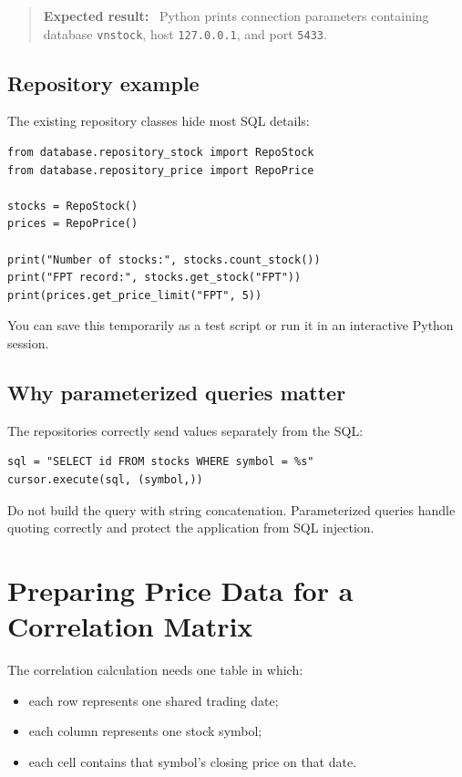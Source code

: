 \documentclass[11pt,a4paper]{article}
\newenvironment{result}
  {\begin{quote}\color{codegreen}\textbf{Expected result:}\ }
  {\end{quote}}
\begin{document}
\begin{result}
Python prints connection parameters containing database
\texttt{vnstock}, host \texttt{127.0.0.1}, and port \texttt{5433}.
\end{result}

\subsection{Repository example}

The existing repository classes hide most SQL details:

\begin{lstlisting}[style=python]
from database.repository_stock import RepoStock
from database.repository_price import RepoPrice

stocks = RepoStock()
prices = RepoPrice()

print("Number of stocks:", stocks.count_stock())
print("FPT record:", stocks.get_stock("FPT"))
print(prices.get_price_limit("FPT", 5))
\end{lstlisting}

You can save this temporarily as a test script or run it in an interactive
Python session.

\subsection{Why parameterized queries matter}

The repositories correctly send values separately from the SQL:

\begin{lstlisting}[style=python]
sql = "SELECT id FROM stocks WHERE symbol = %s"
cursor.execute(sql, (symbol,))
\end{lstlisting}

Do not build the query with string concatenation. Parameterized queries handle
quoting correctly and protect the application from SQL injection.

\section{Preparing Price Data for a Correlation Matrix}

The correlation calculation needs one table in which:

\begin{itemize}[leftmargin=2em]
    \item each row represents one shared trading date;
    \item each column represents one stock symbol;
    \item each cell contains that symbol's closing price on that date.
\end{itemize}
\end{document}
